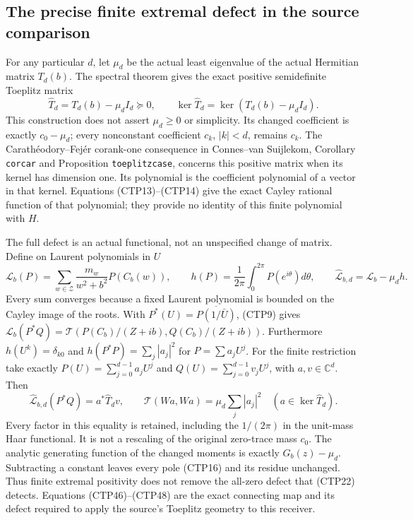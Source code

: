 \subsection{The precise finite extremal defect in the source comparison}

For any particular $d$, let $\mu_d$ be the actual least eigenvalue
of the actual Hermitian matrix $T_d(b)$. The spectral theorem
gives the exact positive semidefinite Toeplitz matrix
\begin{equation}\tag{CTP46}
 \widehat T_d=T_d(b)-\mu_d I_d\succeq0,
 \qquad \ker\widehat T_d=\ker(T_d(b)-\mu_d I_d).
\end{equation}
This construction does not assert $\mu_d\ge0$ or simplicity.
Its changed coefficient is exactly $c_0-\mu_d$; every
nonconstant coefficient $c_k$, $|k|<d$, remains $c_k$.
The Carath\'eodory--Fej\'er corank-one consequence in Connes--van
Suijlekom, Corollary \texttt{corcar} and Proposition
\texttt{toeplitzcase}, concerns this positive matrix when its
kernel has dimension one. Its polynomial is the coefficient
polynomial of a vector in that kernel. Equations (CTP13)--(CTP14)
give the exact Cayley rational function of that polynomial;
they provide no identity of this finite polynomial with $H$.

The full defect is an actual functional, not an unspecified
change of matrix. Define on Laurent polynomials in $U$
\begin{equation}\tag{CTP47}
 \mathscr L_b(P)=\sum_{w\in\mathcal Z}
            \frac{m_w}{w^2+b^2}P(C_b(w)),\qquad
 h(P)=\frac1{2\pi}\int_0^{2\pi}P(e^{i\theta})d\theta,
 \qquad \widehat{\mathscr L}_{b,d}=\mathscr L_b-\mu_d h.
\end{equation}
Every sum converges because a fixed Laurent polynomial is
bounded on the Cayley image of the roots. With
$P^*(U)=\overline{P(1/\bar U)}$, (CTP9) gives
$\mathscr L_b(P^*Q)=\mathcal T(P(C_b)/(Z+ib),Q(C_b)/(Z+ib))$.
Furthermore $h(U^k)=\delta_{k0}$ and
$h(P^*P)=\sum_j|a_j|^2$ for $P=\sum a_jU^j$.
For the finite restriction take exactly
$P(U)=\sum_{j=0}^{d-1}a_jU^j$ and
$Q(U)=\sum_{j=0}^{d-1}v_jU^j$, with $a,v\in\mathbb C^d$.
Then
\begin{equation}\tag{CTP48}
 \widehat{\mathscr L}_{b,d}(P^*Q)=a^*\widehat T_dv,
 \qquad
 \mathcal T(Wa,Wa)=\mu_d\sum_j|a_j|^2
 \quad(a\in\ker\widehat T_d).
\end{equation}
Every factor in this equality is retained, including the
$1/(2\pi)$ in the unit-mass Haar functional. It is not a
rescaling of the original zero-trace mass $c_0$.
The analytic generating function of the changed moments is
exactly $G_b(z)-\mu_d$. Subtracting a constant leaves every
pole (CTP16) and its residue unchanged. Thus finite extremal
positivity does not remove the all-zero defect that (CTP22)
detects. Equations (CTP46)--(CTP48) are the exact connecting
map and its defect required to apply the source's Toeplitz
geometry to this receiver.

